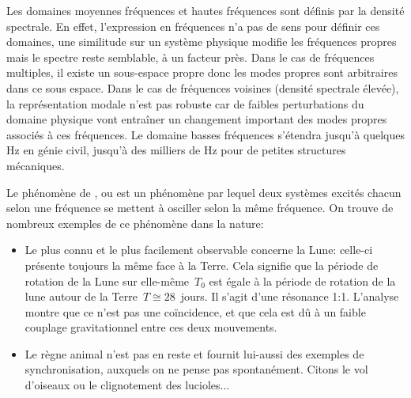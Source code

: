 Les domaines moyennes fréquences et hautes fréquences sont définis par la densité spectrale. En effet, l'expression en fréquences n'a pas de sens pour définir ces domaines, une similitude sur un système physique modifie les fréquences propres mais le spectre reste semblable, à un facteur près. Dans le cas de fréquences multiples, il existe un sous-espace propre donc les modes propres sont arbitraires dans ce sous espace. Dans le cas de fréquences voisines (densité spectrale élevée), la représentation modale n'est pas robuste car de faibles perturbations du domaine physique vont entraîner un changement important des modes propres associés à ces fréquences.  Le domaine basses fréquences s'étendra jusqu'à quelques Hz en génie civil, jusqu'à des milliers de Hz pour de petites structures mécaniques.

\medskip
Le phénomène de , ou  est un phénomène par lequel deux systèmes excités chacun selon une fréquence se mettent à osciller selon la même fréquence. On trouve de nombreux exemples de ce phénomène dans la nature:
\begin{itemize}
  \item Le plus connu et le plus facilement observable concerne la Lune: celle-ci présente toujours la même face à la Terre. Cela signifie que la période de rotation de la Lune sur elle-même~$T_0$ est égale à la période de rotation de la lune autour de la Terre~$T\cong 28$~jours. Il s'agit d'une résonance 1:1. L'analyse montre que ce n'est pas une coïncidence, et que cela est dû à un faible couplage gravitationnel entre ces deux mouvements.

  \item Le règne animal n'est pas en reste et fournit lui-aussi des exemples de synchronisation, auxquels on ne pense pas spontanément. Citons le vol d'oiseaux ou le clignotement des lucioles...
\end{itemize}

